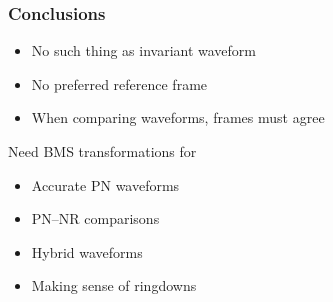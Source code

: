 \documentclass[12pt,xcolor={dvipsnames}]{beamer}
\begin{document}
\begin{frame}
  \frametitle{Conclusions}
  \begin{itemize}
  \item No such thing as invariant waveform
  \item No preferred reference frame
  \item When comparing waveforms, frames must agree
  \end{itemize}

  \vspace{0.2in}
  Need BMS transformations for
  \begin{itemize}
  \item Accurate PN waveforms
  \item PN--NR comparisons
  \item Hybrid waveforms
  \item Making sense of ringdowns
  \end{itemize}
\end{frame}
\end{document}
